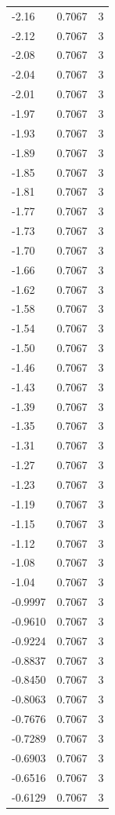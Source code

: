 \begin{longtable}{lrr}
  -2.16 & 0.7067 & 3 \\
  -2.12 & 0.7067 & 3 \\
  -2.08 & 0.7067 & 3 \\
  -2.04 & 0.7067 & 3 \\
  -2.01 & 0.7067 & 3 \\
  -1.97 & 0.7067 & 3 \\
  -1.93 & 0.7067 & 3 \\
  -1.89 & 0.7067 & 3 \\
  -1.85 & 0.7067 & 3 \\
  -1.81 & 0.7067 & 3 \\
  -1.77 & 0.7067 & 3 \\
  -1.73 & 0.7067 & 3 \\
  -1.70 & 0.7067 & 3 \\
  -1.66 & 0.7067 & 3 \\
  -1.62 & 0.7067 & 3 \\
  -1.58 & 0.7067 & 3 \\
  -1.54 & 0.7067 & 3 \\
  -1.50 & 0.7067 & 3 \\
  -1.46 & 0.7067 & 3 \\
  -1.43 & 0.7067 & 3 \\
  -1.39 & 0.7067 & 3 \\
  -1.35 & 0.7067 & 3 \\
  -1.31 & 0.7067 & 3 \\
  -1.27 & 0.7067 & 3 \\
  -1.23 & 0.7067 & 3 \\
  -1.19 & 0.7067 & 3 \\
  -1.15 & 0.7067 & 3 \\
  -1.12 & 0.7067 & 3 \\
  -1.08 & 0.7067 & 3 \\
  -1.04 & 0.7067 & 3 \\
  -0.9997 & 0.7067 & 3 \\
  -0.9610 & 0.7067 & 3 \\
  -0.9224 & 0.7067 & 3 \\
  -0.8837 & 0.7067 & 3 \\
  -0.8450 & 0.7067 & 3 \\
  -0.8063 & 0.7067 & 3 \\
  -0.7676 & 0.7067 & 3 \\
  -0.7289 & 0.7067 & 3 \\
  -0.6903 & 0.7067 & 3 \\
  -0.6516 & 0.7067 & 3 \\
  -0.6129 & 0.7067 & 3 \\

\end{longtable}
